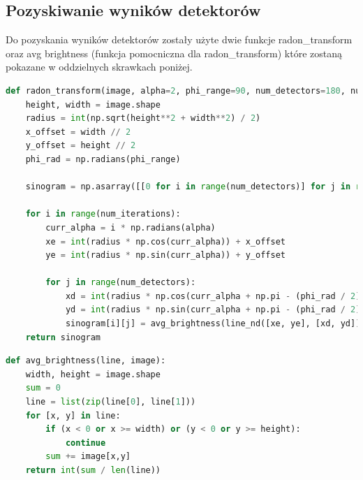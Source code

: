 \documentclass[a4paper,11pt]{article}
\begin{document}
    \subsection{Pozyskiwanie wyników detektorów}
    Do pozyskania wyników detektorów zostały użyte dwie funkcje radon\_transform
    oraz avg brightness (funkcja pomocniczna dla radon\_transform) które zostaną pokazane w oddzielnych skrawkach poniżej.
    \begin{lstlisting}[language=Python, caption=Radon transform, basicstyle=\tiny]
def radon_transform(image, alpha=2, phi_range=90, num_detectors=180, num_iterations=90):
    height, width = image.shape
    radius = int(np.sqrt(height**2 + width**2) / 2)
    x_offset = width // 2
    y_offset = height // 2
    phi_rad = np.radians(phi_range)

    sinogram = np.asarray([[0 for i in range(num_detectors)] for j in range(num_iterations)])

    for i in range(num_iterations):
        curr_alpha = i * np.radians(alpha)
        xe = int(radius * np.cos(curr_alpha)) + x_offset
        ye = int(radius * np.sin(curr_alpha)) + y_offset

        for j in range(num_detectors):
            xd = int(radius * np.cos(curr_alpha + np.pi - (phi_rad / 2) + j * phi_rad/(num_detectors-1))) + x_offset
            yd = int(radius * np.sin(curr_alpha + np.pi - (phi_rad / 2) + j * phi_rad/(num_detectors-1))) + y_offset
            sinogram[i][j] = avg_brightness(line_nd([xe, ye], [xd, yd]), image)
    return sinogram
  \end{lstlisting}

  \begin{lstlisting}[language=Python, caption=Average brightness, basicstyle=\tiny]
def avg_brightness(line, image):
    width, height = image.shape
    sum = 0
    line = list(zip(line[0], line[1]))
    for [x, y] in line:
        if (x < 0 or x >= width) or (y < 0 or y >= height):
            continue
        sum += image[x,y]
    return int(sum / len(line))    
  \end{lstlisting}
  
\end{document}
